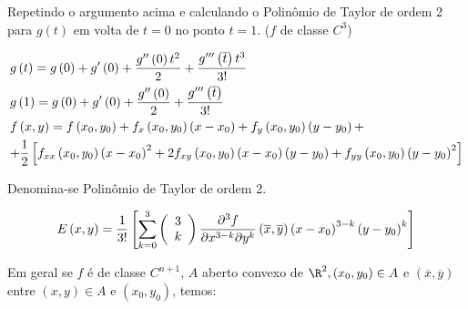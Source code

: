 \documentclass[11pt, oneside, a4paper]{gsm-l}
\begin{document}
\begin{sol}
Repetindo o argumento acima e calculando o Polin\^omio de Taylor de ordem 2 para $g(t)$ em volta de $t=0$ no ponto $t=1$. ($f$ de classe $C^3$)

\[
\begin{gathered}
  g\left( t \right) = g\left( 0 \right) + g'\left( 0 \right) + \frac{{g''\left( 0 \right)t^2 }}
{2} + \frac{{g'''\left( {\overline t } \right)t^3 }}
{{3!}} \hfill \\
  g\left( 1 \right) = g\left( 0 \right) + g'\left( 0 \right) + \frac{{g''\left( 0 \right)}}
{2} + \frac{{g'''\left( {\overline t } \right)}}
{{3!}} \hfill \\
  f\left( {x,y} \right) = f\left( {x_0 ,y_0 } \right) + f_x \left( {x_0 ,y_0 } \right)\left( {x - x_0 } \right) + f_y \left( {x_0 ,y_0 } \right)\left( {y - y_0 } \right) +  \hfill \\
 + \frac{1}{2}\left[ {f_{xx} \left( {x_0 ,y_0 } \right)\left( {x - x_0 } \right)^2  + 2f_{xy} \left( {x_0 ,y_0 } \right)\left( {x - x_0 } \right)\left( {y - y_0 } \right) + f_{yy} \left( {x_0 ,y_0 } \right)\left( {y - y_0 } \right)^2 } \right] \hfill \\
\end{gathered}
\]

Denomina-se Polin\^omio de Taylor de ordem 2.

\[
E\left( {x,y} \right) = \frac{1}
{{3!}}\left[ {\sum\limits_{k = 0}^3 {\left( {\begin{array}{*{20}c}
3  \\
k  \\

\end{array} } \right)\frac{{\partial ^3 f}}
{{\partial x^{3 - k} \partial y^k }}\left( {\overline x ,\overline y } \right)\left( {x - x_0 } \right)^{3 - k} \left( {y - y_0 } \right)^k } } \right]
\]

\end{sol}

Em geral se $f$ é de classe $C^{n+1}$, $A$ aberto convexo de $\R^2, \left( {x_0 ,y_0 } \right) \in A$ e $\left( {\overline x ,\overline y } \right)$ entre $\left( {x,y} \right) \in A$ e $\left( {x_0 ,y_0 } \right)$, temos:
\end{document}
